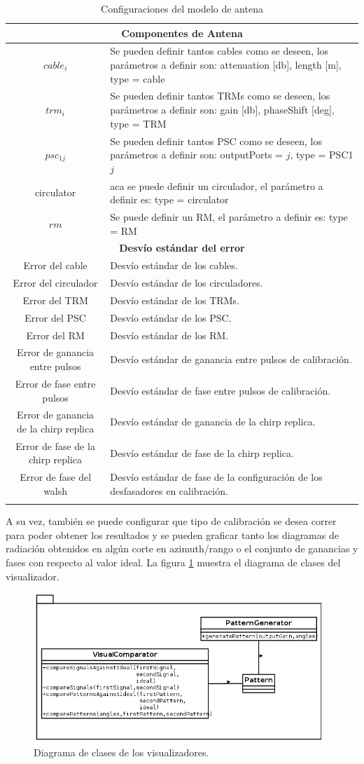 \begin{center}
\begin{longtable}{|c|p{9cm}|}
	\multicolumn{2}{|c|}{\textbf{Componentes de Antena}} \\
	\hline
	$cable_i$ & Se pueden definir tantos cables como se deseen, los parámetros a definir son: attenuation [db], length [m], type = cable \tabularnewline \hline 
	$trm_i$ & Se pueden definir tantos TRMs como se deseen, los parámetros a definir son: gain [db], phaseShift [deg], type = TRM \tabularnewline \hline 
	$psc_{1j}$ & Se pueden definir tantos PSC como se deseen, los parámetros a definir son: outputPorts = $j$, type = PSC1$j$ \tabularnewline \hline 
	circulator & aca se puede definir un circulador, el parámetro a definir es: type = circulator \tabularnewline \hline 
	$rm$ & Se puede definir un RM, el parámetro a definir es: type = RM \tabularnewline \hline 
	\multicolumn{2}{|c|}{\textbf{Desvío estándar del error}} \\
	\hline
	Error del cable & Desvío estándar de los cables. \tabularnewline \hline 
	Error del circulador & Desvío estándar de los circuladores. \tabularnewline \hline 
	Error del TRM & Desvío estándar de los TRMs. \tabularnewline \hline 
	Error del PSC & Desvío estándar de los PSC. \tabularnewline \hline 
	Error del RM & Desvío estándar de los RM. \tabularnewline \hline 
	Error de ganancia entre pulsos & Desvío estándar de ganancia entre pulsos de calibración. \tabularnewline \hline 
	Error de fase entre pulsos & Desvío estándar de fase entre pulsos de calibración. \tabularnewline \hline 
	Error de ganancia de la chirp replica & Desvío estándar de ganancia de la chirp replica. \tabularnewline \hline 
	Error de fase de la chirp replica & Desvío estándar de fase de la chirp replica. \tabularnewline \hline 
	Error de fase del walsh & Desvío estándar de fase de la configuración de los desfasadores en calibración. \tabularnewline \hline 
	\caption{Configuraciones del modelo de antena}
  \end{longtable}
  \label{tab:conf_modelo_antena}
\end{center}

A su vez, también se puede configurar que tipo de calibración se desea correr para poder obtener los resultados y se pueden 
graficar tanto los diagramas de radiación obtenidos en algún corte en azimuth/rango o el conjunto de ganancias y fases con 
respecto al valor ideal. La figura \ref{fig:visualPackage} muestra el diagrama de clases del visualizador.

\begin{figure}[H]
 \centering
 \includegraphics[width=11cm]{gfx/visualPackage.png}
 \caption{Diagrama de clases de los visualizadores.}
 \label{fig:visualPackage}
\end{figure}


